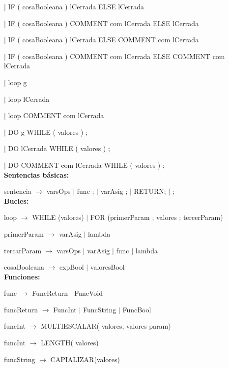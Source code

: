 \documentclass[10pt, a4paper]{article}
\begin{document}
\hspace{15mm}$|$ IF ( cosaBooleana ) lCerrada ELSE lCerrada 

\hspace{15mm}$|$ IF ( cosaBooleana ) COMMENT com lCerrada ELSE lCerrada 

\hspace{15mm}$|$ IF ( cosaBooleana ) lCerrada ELSE  COMMENT com lCerrada 

\hspace{15mm}$|$ IF ( cosaBooleana ) COMMENT com lCerrada ELSE  COMMENT com lCerrada

\hspace{15mm}$|$ loop { g } 

\hspace{15mm}$|$ loop lCerrada 

\hspace{15mm}$|$ loop COMMENT com lCerrada

\hspace{15mm}$|$ DO { g } WHILE ( valores ) ;
  
\hspace{15mm}$|$ DO lCerrada WHILE ( valores ) ;  
  
\hspace{15mm}$|$  DO COMMENT com lCerrada WHILE ( valores ) ; \\


\textbf{Sentencias básicas:}

sentencia $\rightarrow$ varsOps $|$ func ; $|$ varAsig ; $|$ RETURN; $|$ ; \\


\textbf{Bucles:}

loop $\rightarrow$ WHILE (valores) $|$ FOR (primerParam ; valores ; tercerParam)

primerParam $\rightarrow$  varAsig $|$ lambda

tercarParam $\rightarrow$  varsOps $|$ varAsig $|$ func $|$ lambda

cosaBooleana $\rightarrow$ expBool $|$ valoresBool \\
  

\textbf{Funciones:}

func $\rightarrow$ FuncReturn $|$ FuncVoid

funcReturn $\rightarrow$ FuncInt $|$ FuncString $|$ FuncBool

funcInt $\rightarrow$ MULTIESCALAR( valores, valores param)

funcInt $\rightarrow$ LENGTH( valores)

funcString $\rightarrow$ CAPIALIZAR(valores)
\end{document}
